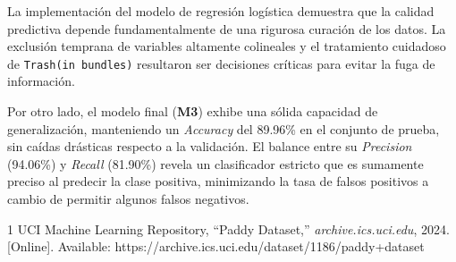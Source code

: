 \documentclass[journal]{IEEEtran}
\begin{document}
La implementación del modelo de regresión logística demuestra que la calidad predictiva depende fundamentalmente de una rigurosa curación de los datos. La exclusión temprana de variables altamente colineales y el tratamiento cuidadoso de \texttt{Trash(in bundles)} resultaron ser decisiones críticas para evitar la fuga de información.

Por otro lado, el modelo final (\textbf{M3}) exhibe una sólida capacidad de generalización, manteniendo un \emph{Accuracy} del 89.96\% en el conjunto de prueba, sin caídas drásticas respecto a la validación. El balance entre su \emph{Precision} (94.06\%) y \emph{Recall} (81.90\%) revela un clasificador estricto que es sumamente preciso al predecir la clase positiva, minimizando la tasa de falsos positivos a cambio de permitir algunos falsos negativos.

\begin{thebibliography}{1}
 UCI Machine Learning Repository, ``Paddy Dataset,'' \emph{archive.ics.uci.edu}, 2024. [Online]. Available: https://archive.ics.uci.edu/dataset/1186/paddy+dataset
\end{thebibliography}
\end{document}

